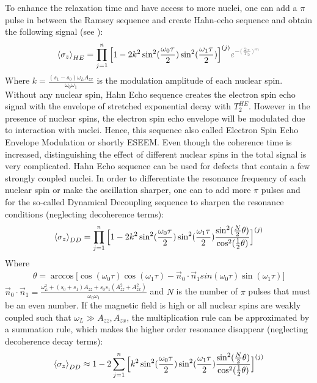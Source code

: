 \documentclass[%
 reprint,
superscriptaddress,
 amsmath,amssymb,
 aps,
]{revtex4-2}
\begin{document}
To enhance the relaxation time and have access to more nuclei, one can add a $\pi$ pulse in between the Ramsey sequence and create Hahn-echo sequence and obtain the following signal (see \cite{Maze, HahnEchoESEEM}):
\begin{gather}
	\expval{\sigma_z}_{HE} = \prod_{j=1}^n \Big[1 - 2 k^2 
	\sin^2(\frac{\omega_0 \tau}{2}) \sin^2(\frac{\omega_1 \tau}{2})\Big]^{(j)} \textcolor{gray}{ e^{-(\frac{2\tau}{T_2})^m}}
\end{gather}
Where $k = \frac{(s_1-s_0)\omega_L A_{zx}}{\omega_0 \omega_1}$ is the modulation amplitude of each nuclear spin.  
Without any nuclear spin, Hahn Echo sequence creates the electron spin echo signal with the envelope of stretched exponential decay with $T_2^{HE}$. 
However in the presence of nuclear spins, the electron spin echo envelope will be modulated due to interaction with nuclei. 
Hence, this sequence also called Electron Spin Echo Envelope Modulation or shortly ESEEM. 
Even though the coherence time is increased, distinguishing the effect of different nuclear spins in the total signal is very complicated. 
Hahn Echo sequence can be used for defects that contain a few strongly coupled nuclei. In order to differentiate the resonance frequency of each nuclear spin or make the oscillation sharper, one can to add more $\pi$ pulses and for the so-called Dynamical Decoupling sequence to sharpen the resonance conditions (neglecting decoherence terms):
\begin{gather}
	\expval{\sigma_z}_{DD} =
	\prod_{j=1}^n \Big[1- 2 k^2  
	\sin^2(\frac{\omega_0 \tau}{2}) \sin^2(\frac{\omega_1 \tau}{2}) \frac{\sin^2(\frac{N}{2} \theta)}{\cos^2(\frac{1}{2}\theta)}  \Big]^{(j)} %
\end{gather}
Where
\begin{gather}
	\theta=  \arccos\Big[\cos(\omega_0 \tau) \cos(\omega_1 \tau)- \vec{n}_0 \cdot \vec{n}_1 sin(\omega_0 \tau) \sin(\omega_1 \tau) \Big]
\end{gather}
$\vec{n}_0 \cdot \vec{n}_1 = \frac{\omega_L^2+(s_0+s_1)A_{zz}+s_0 s_1 (A_{zz}^2+A_{zx}^2)}{\omega_0 \omega_1}$ and $N$ is the number of $\pi$ pulses that must be an even number.
 If the magnetic field is high or all nuclear spins are weakly coupled such that $\omega_L \gg A_{zz}, A_{zx}$, the multiplication rule can be approximated by a summation rule, which makes the higher order resonance disappear (neglecting decoherence decay terms):
\begin{gather}
	\expval{\sigma_z}_{DD} \approx 1 -2
	\sum_{j=1}^n \Big[ k^2 	 \sin^2(\frac{\omega_0 \tau}{2}) \sin^2(\frac{\omega_1 \tau}{2}) \frac{\sin^2(\frac{N}{2} \theta)}{\cos^2(\frac{1}{2}\theta)}  \Big]^{(j)} %
\end{gather}
\end{document}
